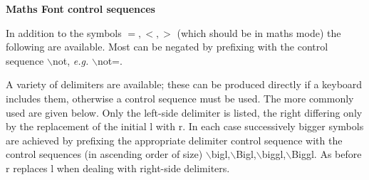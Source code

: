 {\bf  Maths Font control sequences}
\medskip



In addition to the symbols $=,<,>$ (which should be in maths mode)
the following are available. Most can be negated by prefixing
with the control sequence $\backslash$not, {\it e.g.} $\backslash$not=.




A variety of delimiters are available; these can be produced directly if
a keyboard includes them, otherwise a control sequence must be used.
The more commonly used are given below.
Only the left-side delimiter is listed, the right differing
only by the replacement of the initial l with r. In each case successively bigger
symbols are achieved by prefixing the appropriate delimiter control
sequence with the control sequences (in ascending order of size)
$\backslash$bigl,$\backslash$Bigl,$\backslash$biggl,$\backslash$Biggl. As before r replaces l when dealing with
right-side delimiters.


\line{~~~~~~$\backslash$lbrack                  \hfil\%  $[$~~~~~~}
\bye




